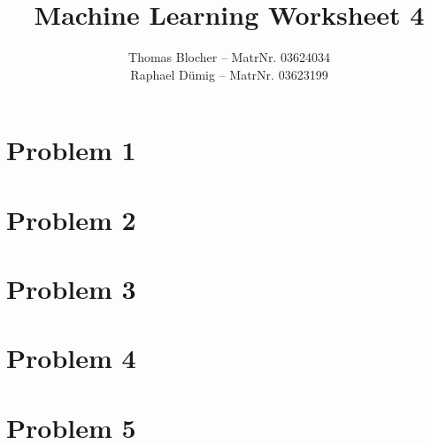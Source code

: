 \documentclass{scrartcl}
\title{Machine Learning Worksheet 4}
\author{Thomas Blocher -- MatrNr. 03624034 \\ Raphael D\"umig -- MatrNr. 03623199}
\begin{document}
\maketitle

\section*{Problem 1}


\section*{Problem 2}


\section*{Problem 3}


\section*{Problem 4}


\section*{Problem 5}

\end{document}
